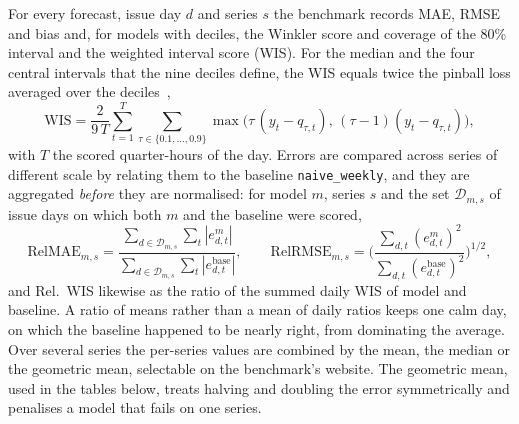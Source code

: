 \documentclass[11pt,a4paper]{article}
\newcommand{\m}[1]{\texttt{#1}}
\begin{document}
For every forecast, issue day $d$ and series $s$ the benchmark records MAE, RMSE and bias and, for models with deciles,
the Winkler score and coverage of the 80\% interval and the weighted interval score (WIS). For the median and the four
central intervals that the nine deciles define, the WIS equals twice the pinball loss averaged over the
deciles~\cite{bracher},
\begin{equation}
\mathrm{WIS} = \frac{2}{9\,T}\sum_{t=1}^{T}\sum_{\tau\in\{0.1,\dots,0.9\}} \max\!\big(\tau\,(y_t - q_{\tau,t}),\,(\tau-1)(y_t - q_{\tau,t})\big),
\end{equation}
with $T$ the scored quarter-hours of the day. Errors are compared across series of different scale by relating them
to the baseline \m{naive\_weekly}, and they are aggregated \emph{before} they are normalised: for model $m$, series
$s$ and the set $\mathcal{D}_{m,s}$ of issue days on which both $m$ and the baseline were scored,
\begin{equation}
\mathrm{RelMAE}_{m,s} = \frac{\sum_{d\in\mathcal{D}_{m,s}} \sum_t |e^{m}_{d,t}|}{\sum_{d\in\mathcal{D}_{m,s}} \sum_t |e^{\text{base}}_{d,t}|},
\qquad
\mathrm{RelRMSE}_{m,s} = \Big(\frac{\sum_{d,t} (e^{m}_{d,t})^2}{\sum_{d,t} (e^{\text{base}}_{d,t})^2}\Big)^{1/2},
\end{equation}
and Rel.\ WIS likewise as the ratio of the summed daily WIS of model and baseline.
A ratio of means rather than a mean of daily ratios keeps one calm day, on which the baseline happened to be nearly
right, from dominating the average. Over several series the per-series values are combined by the mean, the median or
the geometric mean, selectable on the benchmark's website. The geometric mean, used in the tables below, treats halving and
doubling the error symmetrically and penalises a model that fails on one series.
\end{document}
